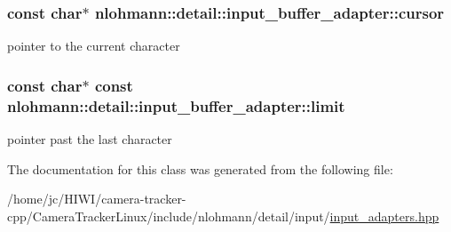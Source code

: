 \subsubsection[{\texorpdfstring{cursor}{cursor}}]{\setlength{\rightskip}{0pt plus 5cm}const char$\ast$ nlohmann\+::detail\+::input\+\_\+buffer\+\_\+adapter\+::cursor\hspace{0.3cm}{\ttfamily [private]}}\hypertarget{classnlohmann_1_1detail_1_1input__buffer__adapter_a49e6c8b6555af489a45ef51737eafa1c}{}\label{classnlohmann_1_1detail_1_1input__buffer__adapter_a49e6c8b6555af489a45ef51737eafa1c}


pointer to the current character 

\subsubsection[{\texorpdfstring{limit}{limit}}]{\setlength{\rightskip}{0pt plus 5cm}const char$\ast$ const nlohmann\+::detail\+::input\+\_\+buffer\+\_\+adapter\+::limit\hspace{0.3cm}{\ttfamily [private]}}\hypertarget{classnlohmann_1_1detail_1_1input__buffer__adapter_abbea9cdb1862e55bc1e142a72a947da4}{}\label{classnlohmann_1_1detail_1_1input__buffer__adapter_abbea9cdb1862e55bc1e142a72a947da4}


pointer past the last character 



The documentation for this class was generated from the following file\+:\begin{DoxyCompactItemize}
\item 
/home/jc/\+H\+I\+W\+I/camera-\/tracker-\/cpp/\+Camera\+Tracker\+Linux/include/nlohmann/detail/input/\hyperlink{input__adapters_8hpp}{input\+\_\+adapters.\+hpp}\end{DoxyCompactItemize}
